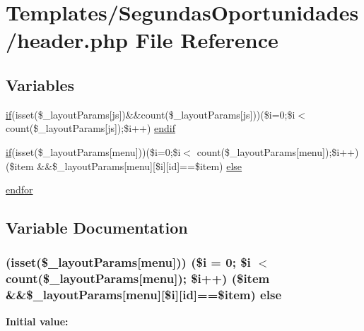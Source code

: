 \hypertarget{header_8php}{}\section{Templates/\+Segundas\+Oportunidades/header.php File Reference}
\label{header_8php}
\subsection*{Variables}
\begin{DoxyCompactItemize}
\item 
\hyperlink{app_2views_2index_2index_8php_a3d726968fd3dc3d64cac837a26187799}{if}(isset(\$\+\_\+layout\+Params\mbox{[}\textquotesingle{}js\textquotesingle{}\mbox{]})\&\&count(\$\+\_\+layout\+Params\mbox{[}\textquotesingle{}js\textquotesingle{}\mbox{]}))(\$i=0;\$i$<$ count(\$\+\_\+layout\+Params\mbox{[}\textquotesingle{}js\textquotesingle{}\mbox{]});\$i++) \hyperlink{header_8php_a7919c3af50b9977dac531548423051e3}{endif}
\item 
\hyperlink{app_2views_2index_2index_8php_a3d726968fd3dc3d64cac837a26187799}{if}(isset(\$\+\_\+layout\+Params\mbox{[}\textquotesingle{}menu\textquotesingle{}\mbox{]}))(\$i=0;\$i$<$ count(\$\+\_\+layout\+Params\mbox{[}\textquotesingle{}menu\textquotesingle{}\mbox{]});\$i++)(\$item \&\&\$\+\_\+layout\+Params\mbox{[}\textquotesingle{}menu\textquotesingle{}\mbox{]}\mbox{[}\$i\mbox{]}\mbox{[}\textquotesingle{}id\textquotesingle{}\mbox{]}==\$item) \hyperlink{header_8php_aafe3d66a75b8195106636aa01f257a66}{else}
\item 
\hyperlink{header_8php_ae8fdc27183f296411bac00ed522ee1ac}{endfor}
\end{DoxyCompactItemize}


\subsection{Variable Documentation}
\hypertarget{header_8php_aafe3d66a75b8195106636aa01f257a66}{}
\subsubsection[{else}]{(isset(\$\+\_\+layout\+Params\mbox{[}\textquotesingle{}menu\textquotesingle{}\mbox{]})) (\$i = 0; \$i $<$ count(\$\+\_\+layout\+Params\mbox{[}\textquotesingle{}menu\textquotesingle{}\mbox{]}); \$i++) (\$item \&\&\$\+\_\+layout\+Params\mbox{[}\textquotesingle{}menu\textquotesingle{}\mbox{]}\mbox{[}\$i\mbox{]}\mbox{[}\textquotesingle{}id\textquotesingle{}\mbox{]}==\$item) else}\label{header_8php_aafe3d66a75b8195106636aa01f257a66}
{\bfseries Initial value\+:}
\hypertarget{header_8php_ae8fdc27183f296411bac00ed522ee1ac}{}
